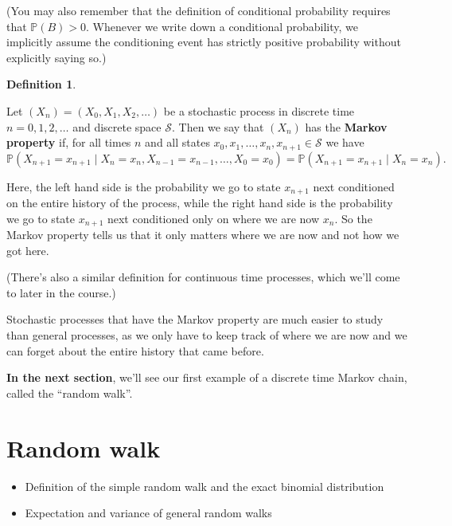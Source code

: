 \documentclass[
  a4paper,
]{article}
\providecommand{\tightlist}{%
  \setlength{\itemsep}{0pt}\setlength{\parskip}{0pt}}
\theoremstyle{definition}
\newtheorem{definition}{Definition}[section]
\theoremstyle{definition}
\theoremstyle{definition}
\theoremstyle{remark}
\begin{document}
(You may also remember that the definition of conditional probability requires that \(\mathbb P(B) > 0\). Whenever we write down a conditional probability, we implicitly assume the conditioning event has strictly positive probability without explicitly saying so.)

\begin{definition}
\protect\hypertarget{def:def-markov-property}{}\label{def:def-markov-property}

Let \((X_n) = (X_0, X_1, X_2, \dots)\) be a stochastic process in discrete time \(n = 0,1,2,\dots\) and discrete space \(\mathcal S\). Then we say that \((X_n)\) has the \textbf{Markov property} if, for all times \(n\) and all states \(x_0, x_1, \dots,x_n, x_{n+1} \in \mathcal S\) we have
\[  \mathbb P(X_{n+1}=x_{n+1} \mid X_{n}=x_{n}, X_{n-1} = x_{n-1}, \dots,X_0=x_0) = \mathbb P(X_{n+1}=x_{n+1} \mid X_{n}=x_{n}) . \]

\end{definition}

Here, the left hand side is the probability we go to state \(x_{n+1}\) next conditioned on the entire history of the process, while the right hand side is the probability we go to state \(x_{n+1}\) next conditioned only on where we are now \(x_n\). So the Markov property tells us that it only matters where we are now and not how we got here.

(There's also a similar definition for continuous time processes, which we'll come to later in the course.)

Stochastic processes that have the Markov property are much easier to study than general processes, as we only have to keep track of where we are now and we can forget about the entire history that came before.

\textbf{In the next section}, we'll see our first example of a discrete time Markov chain, called the ``random walk''.

\hypertarget{S02-random-walk}{%
\section{Random walk}\label{S02-random-walk}}

\newcommand{\Var}{\operatorname{Var}}

\begin{itemize}
\tightlist
\item
  Definition of the simple random walk and the exact binomial distribution
\item
  Expectation and variance of general random walks
\end{itemize}
\end{document}
